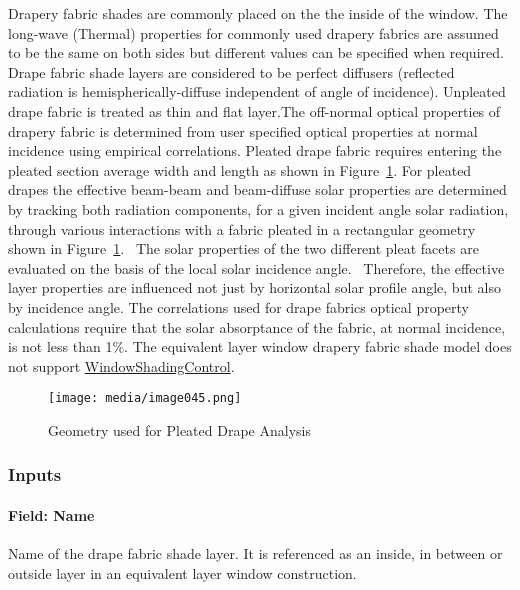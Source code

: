 Drapery fabric shades are commonly placed on the the inside of the window. The long-wave (Thermal) properties for commonly used drapery fabrics are assumed to be the same on both sides but different values can be specified when required. Drape fabric shade layers are considered to be perfect diffusers (reflected radiation is hemispherically-diffuse independent of angle of incidence). Unpleated drape fabric is treated as thin and flat layer.The off-normal optical properties of drapery fabric is determined from user specified optical properties at normal incidence using empirical correlations. Pleated drape fabric requires entering the pleated section average width and length as shown in Figure~\ref{fig:geometry-used-for-pleated-drape-analysis}. For pleated drapes the effective beam-beam and beam-diffuse solar properties are determined by tracking both radiation components, for a given incident angle solar radiation, through various interactions with a fabric pleated in a rectangular geometry shown in Figure~\ref{fig:geometry-used-for-pleated-drape-analysis}.~ The solar properties of the two different pleat facets are evaluated on the basis of the local solar incidence angle.~ Therefore, the effective layer properties are influenced not just by horizontal solar profile angle, but also by incidence angle. The correlations used for drape fabrics optical property calculations require that the solar absorptance of the fabric, at normal incidence, is not less than 1\%. The equivalent layer window drapery fabric shade model does not support \hyperref[windowpropertyshadingcontrol]{WindowShadingControl}.

\begin{figure}[hbtp] %
\centering
\texttt{[image: media/image045.png]}
\caption{Geometry used for Pleated Drape Analysis \protect \label{fig:geometry-used-for-pleated-drape-analysis}}
\end{figure}

\subsubsection{Inputs}\label{inputs-27-002}

\paragraph{Field: Name}\label{field-name-21-003}

Name of the drape fabric shade layer. It is referenced as an inside, in between or outside layer in an equivalent layer window construction.

